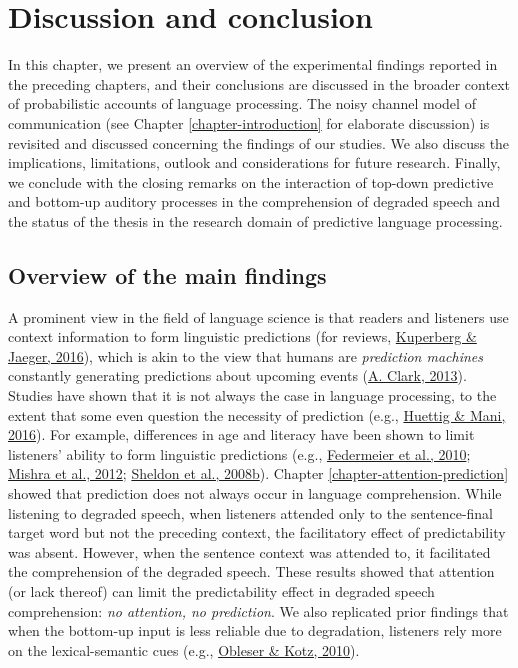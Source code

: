 \documentclass[a4paper, nobind]{templates/ociamthesis}
\begin{document}
\hypertarget{chapter-conclusion}{%
\chapter{Discussion and conclusion}\label{chapter-conclusion}}

In this chapter, we present an overview of the experimental findings reported in the preceding chapters, and
their conclusions are discussed in the broader context of probabilistic accounts of language processing.
The noisy channel model of communication (see Chapter \ref{chapter-introduction} for elaborate discussion) is revisited and discussed concerning the findings of our studies.
We also discuss the implications, limitations, outlook and considerations for future research.
Finally, we conclude with the closing remarks on the interaction of top-down predictive and bottom-up auditory processes in the comprehension of degraded speech
and the status of the thesis in the research domain of predictive language processing.

\hypertarget{overview-of-the-main-findings}{%
\section{Overview of the main findings}\label{overview-of-the-main-findings}}

A prominent view in the field of language science is that readers and listeners use context information to form linguistic predictions (for reviews, \protect\hyperlink{ref-Kuperberg2016}{Kuperberg \& Jaeger, 2016}),
which is akin to the view that humans are \emph{prediction machines} constantly generating predictions about upcoming events (\protect\hyperlink{ref-Clark2013}{A. Clark, 2013}).
Studies have shown that it is not always the case in language processing,
to the extent that some even question the necessity of prediction (e.g., \protect\hyperlink{ref-Huettig2016}{Huettig \& Mani, 2016}).
For example, differences in age and literacy have been shown to limit listeners' ability to form linguistic predictions (e.g., \protect\hyperlink{ref-Federmeier2010}{Federmeier et al., 2010}; \protect\hyperlink{ref-Mishra2012}{Mishra et al., 2012}; \protect\hyperlink{ref-Sheldon2008b}{Sheldon et al., 2008b}).
Chapter \ref{chapter-attention-prediction} showed that prediction does not always occur in language comprehension.
While listening to degraded speech, when listeners attended only to the sentence-final target word but not the preceding context, the facilitatory effect of predictability was absent.
However, when the sentence context was attended to, it facilitated the comprehension of the degraded speech.
These results showed that attention (or lack thereof) can limit the predictability effect in degraded speech comprehension: \emph{no attention, no prediction}.
We also replicated prior findings that when the bottom-up input is less reliable due to degradation,
listeners rely more on the lexical-semantic cues (e.g., \protect\hyperlink{ref-Obleser2010}{Obleser \& Kotz, 2010}).
\end{document}
